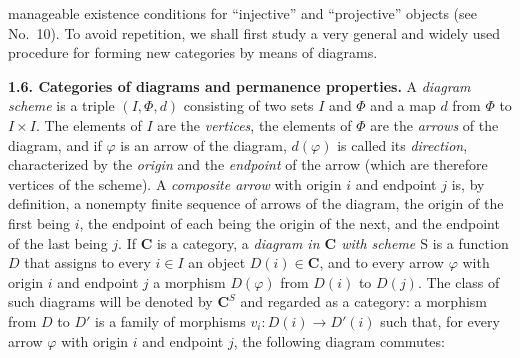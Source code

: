 
\noindent manageable existence conditions for ``injective'' and
``projective'' objects (see No.~10). To avoid repetition, we shall first study
a very general and widely used procedure for forming new categories by means
of diagrams.

\noindent\textbf{1.6. Categories of diagrams and permanence properties.}
A \textit{diagram scheme} is a triple $(I,\Phi,d)$ consisting of two sets $I$
and $\Phi$ and a map $d$ from $\Phi$ to $I\times I$. The elements of $I$ are
the \textit{vertices}, the elements of $\Phi$ are the \textit{arrows} of the
diagram, and if $\varphi$ is an arrow of the diagram, $d(\varphi)$ is called
its \textit{direction}, characterized by the \textit{origin} and the
\textit{endpoint} of the arrow (which are therefore vertices of the scheme).
A \textit{composite arrow} with origin $i$ and endpoint $j$ is, by definition,
a nonempty finite sequence of arrows of the diagram, the origin of the first
being $i$, the endpoint of each being the origin of the next, and the endpoint
of the last being $j$.
If $\mathbf{C}$ is a category, a \textit{diagram in $\mathbf{C}$ with scheme $\mathrm{S}$} is a function
$D$ that assigns to every $i\in I$ an object $D(i)\in \mathbf{C}$, and to every arrow
$\varphi$ with origin $i$ and endpoint $j$ a morphism $D(\varphi)$ from $D(i)$
to $D(j)$. The class of such diagrams will be denoted by $\mathbf{C}^S$ and regarded as
a category: a morphism from $D$ to $D'$ is a family of morphisms
$v_i:D(i)\to D'(i)$ such that, for every arrow $\varphi$ with
origin $i$ and endpoint $j$, the following diagram commutes:

